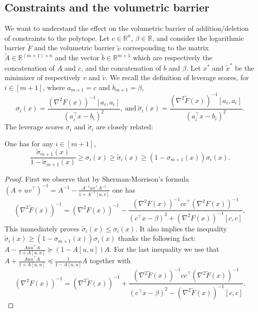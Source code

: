 \subsection{Constraints and the volumetric barrier} \label{sec:constraintsvolumetric}
We want to understand the effect on the volumetric barrier of addition/deletion of constraints to the polytope. Let $c \in \mathbb{R}^n$, $\beta \in \mathbb{R}$, and consider the logarithmic barrier $\tilde{F}$ and the volumetric barrier $\tilde{v}$ corresponding to the matrix $\tilde{A}\in \mathbb{R}^{(m+1) \times n}$ and the vector $\tilde{b} \in \mathbb{R}^{m+1}$ which are respectively the concatenation of $A$ and $c$, and the concatenation of $b$ and $\beta$. Let $x^*$ and $\tilde{x}^*$ be the minimizer of respectively $v$ and $\tilde{v}$. We recall the definition of leverage scores, for $i \in [m+1]$, where $a_{m+1}=c$ and $b_{m+1}=\beta$,
$$\sigma_i(x) = \frac{(\nabla^2 F(x) )^{-1}[a_i, a_i]}{(a_i^{\top} x - b_i)^2}, \ \text{and} \ \tilde{\sigma}_i(x) = \frac{(\nabla^2 \tilde{F}(x) )^{-1}[a_i, a_i]}{(a_i^{\top} x - b_i)^2}.$$
The leverage scores $\sigma_i$ and $\tilde{\sigma}_i$ are closely related:
\begin{lemma} \label{lem:V1}
One has for any $i \in [m+1]$,
$$\frac{\tilde{\sigma}_{m+1}(x)}{1 - \tilde{\sigma}_{m+1}(x)} \geq \sigma_i(x) \geq \tilde{\sigma}_i(x) \geq (1-\sigma_{m+1}(x)) \sigma_i(x) .$$
\end{lemma}

\begin{proof}
First we observe that by Sherman-Morrison's formula $(A+uv^{\top})^{-1} = A^{-1} - \frac{A^{-1} u v^{\top} A^{-1}}{1+A^{-1}[u,v]}$ one has
\begin{equation} \label{eq:SM}
(\nabla^2 \tilde{F}(x))^{-1} = (\nabla^2 F(x))^{-1} - \frac{(\nabla^2 F(x))^{-1} c c^{\top} (\nabla^2 F(x))^{-1}}{(c^{\top} x - \beta)^2 + (\nabla^2 F(x))^{-1}[c,c]} ,
\end{equation}
This immediately proves $\tilde{\sigma}_i(x) \leq \sigma_i(x)$. It also implies the inequality $\tilde{\sigma}_i(x) \geq (1-\sigma_{m+1}(x)) \sigma_i(x)$ thanks the following fact: $A - \frac{A u u^{\top} A}{1+A[u,u]} \succeq (1-A[u,u]) A$. For the last inequality we use that $A + \frac{A u u^{\top} A}{1+A[u,u]} \preceq \frac{1}{1-A[u,u]} A$ together with
$$(\nabla^2 {F}(x))^{-1} = (\nabla^2 \tilde{F}(x))^{-1} + \frac{(\nabla^2 \tilde{F}(x))^{-1} c c^{\top} (\nabla^2 \tilde{F}(x))^{-1}}{(c^{\top} x - \beta)^2 - (\nabla^2 \tilde{F}(x))^{-1}[c,c]} .$$
\end{proof}

